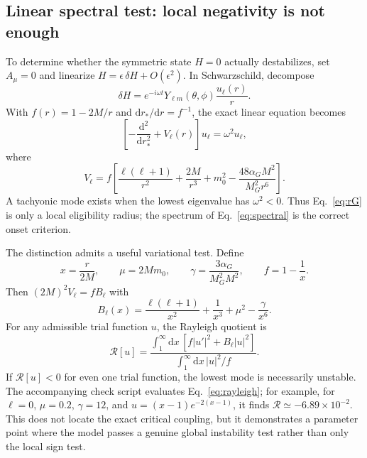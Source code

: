 \documentclass[11pt]{article}
\newcommand{\dd}{\mathrm{d}}
\begin{document}
\subsection{Linear spectral test: local negativity is not enough}
To determine whether the symmetric state $H=0$ actually destabilizes, set $A_\mu=0$ and linearize $H=\epsilon\,\delta H+O(\epsilon^2)$.  In Schwarzschild, decompose
\begin{equation}
\delta H=e^{-i\omega t}Y_{\ell m}(\theta,\phi)\frac{u_\ell(r)}{r}.
\end{equation}
With $f(r)=1-2M/r$ and $\dd r_*/\dd r=f^{-1}$, the exact linear equation becomes
\begin{equation}
\left[-\frac{\dd^2}{\dd r_*^2}+V_\ell(r)\right]u_\ell=\omega^2 u_\ell,
\label{eq:spectral}
\end{equation}
where
\begin{equation}
\boxed{
V_\ell=f\left[
\frac{\ell(\ell+1)}{r^2}+\frac{2M}{r^3}+m_0^2
-\frac{48\alpha_GM^2}{M_G^2r^6}
\right].}
\label{eq:Vschw}
\end{equation}
A tachyonic mode exists when the lowest eigenvalue has $\omega^2<0$.  Thus Eq.~\eqref{eq:rG} is only a local eligibility radius; the spectrum of Eq.~\eqref{eq:spectral} is the correct onset criterion.

The distinction admits a useful variational test.  Define
\begin{equation}
x=\frac{r}{2M},\qquad
\mu=2Mm_0,\qquad
\gamma=\frac{3\alpha_G}{M_G^2M^2},\qquad f=1-\frac1x.
\end{equation}
Then $(2M)^2V_\ell=f B_\ell$ with
\begin{equation}
B_\ell(x)=\frac{\ell(\ell+1)}{x^2}+\frac1{x^3}+\mu^2-\frac{\gamma}{x^6}.
\end{equation}
For any admissible trial function $u$, the Rayleigh quotient is
\begin{equation}
\boxed{
\mathcal R[u]=
\frac{\displaystyle\int_1^\infty\!\dd x\,
\left[f|u'|^2+B_\ell|u|^2\right]}
{\displaystyle\int_1^\infty\!\dd x\,|u|^2/f}.}
\label{eq:rayleigh}
\end{equation}
If $\mathcal R[u]<0$ for even one trial function, the lowest mode is necessarily unstable.  The accompanying check script evaluates Eq.~\eqref{eq:rayleigh}; for example, for $\ell=0$, $\mu=0.2$, $\gamma=12$, and $u=(x-1)e^{-2(x-1)}$, it finds $\mathcal R\simeq-6.89\times10^{-2}$.  This does not locate the exact critical coupling, but it demonstrates a parameter point where the model passes a genuine global instability test rather than only the local sign test.
\end{document}
